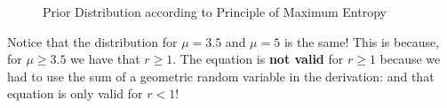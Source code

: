 \documentclass[10pt,\jkfside,a4paper]{article}
\begin{document}
\begin{enumerate}
\begin{enumerate}
\begin{figure}[H]
            \caption{Prior Distribution according to Principle of Maximum Entropy}

        \end{figure}

        Notice that the distribution for $\mu = 3.5$ and $\mu = 5$ is the same! This is because, for $\mu \ge 3.5$ we have that $r \ge 1$. The equation is \textbf{not valid} for $r \ge 1$ because we had to use
        the sum of a geometric random variable in the derivation: and that equation is only valid for $r < 1$!

    \end{enumerate}

\end{enumerate}
\end{document}
